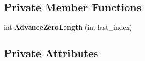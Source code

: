 \subsection*{Private Member Functions}
\begin{DoxyCompactItemize}
\item 
int {\bfseries Advance\+Zero\+Length} (int last\+\_\+index)\hypertarget{classv8_1_1internal_1_1_reg_exp_impl_1_1_global_cache_acda7b8da18532f02a785bc6fa98e5c40}{}\label{classv8_1_1internal_1_1_reg_exp_impl_1_1_global_cache_acda7b8da18532f02a785bc6fa98e5c40}

\end{DoxyCompactItemize}
\subsection*{Private Attributes}
